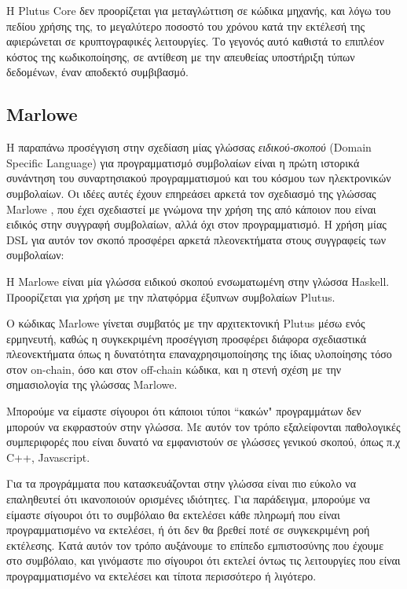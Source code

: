 Η Plutus Core δεν προορίζεται για μεταγλώττιση σε κώδικα μηχανής, και λόγω του πεδίου χρήσης
της, το μεγαλύτερο ποσοστό του χρόνου κατά την εκτέλεσή της αφιερώνεται σε κρυπτογραφικές 
λειτουργίες. Το γεγονός αυτό καθιστά το επιπλέον κόστος της κωδικοποίησης, σε αντίθεση με την
απευθείας υποστήριξη τύπων δεδομένων, έναν αποδεκτό συμβιβασμό.   
                               
                                                                  
                                                                   
                                  
                                   \subsection{Marlowe}    
     
      Η παραπάνω προσέγγιση στην σχεδίαση μίας γλώσσας \emph{ειδικού-σκοπού}  (Domain Specific Language) για προγραμματισμό συμβολαίων είναι η πρώτη ιστορικά
      συνάντηση του συναρτησιακού προγραμματισμού και του κόσμου των ηλεκτρονικών συμβολαίων. 
      Οι ιδέες αυτές έχουν επηρεάσει αρκετά τον σχεδιασμό της γλώσσας Marlowe \cite{marlowe}, που έχει
      σχεδιαστεί με γνώμονα την χρήση της από κάποιον που είναι ειδικός στην συγγραφή συμβολαίων, αλλά
      όχι στον προγραμματισμό. Η χρήση μίας DSL για αυτόν τον σκοπό προσφέρει αρκετά πλεονεκτήματα
      στους συγγραφείς των συμβολαίων:
      
      Η Marlowe είναι μία γλώσσα ειδικού σκοπού ενσωματωμένη στην γλώσσα Haskell. Προορίζεται για χρήση
      με την πλατφόρμα έξυπνων συμβολαίων Plutus.
      
      
      Ο κώδικας Marlowe γίνεται συμβατός με την αρχιτεκτονική Plutus μέσω ενός ερμηνευτή, καθώς η 
      συγκεκριμένη προσέγγιση προσφέρει διάφορα σχεδιαστικά πλεονεκτήματα όπως η δυνατότητα 
      επαναχρησιμοποίησης της ίδιας υλοποίησης τόσο στον on-chain, όσο και στον off-chain κώδικα,
      και η στενή σχέση με την σημασιολογία της γλώσσας Marlowe. 
     

Μπορούμε να είμαστε σίγουροι ότι κάποιοι τύποι ``κακών" προγραμμάτων δεν μπορούν να εκφραστούν
στην γλώσσα. Με αυτόν τον τρόπο εξαλείφονται παθολογικές συμπεριφορές που είναι δυνατό να εμφανιστούν
σε γλώσσες γενικού σκοπού, όπως π.χ C++, Javascript. 

Για τα προγράμματα που κατασκευάζονται στην γλώσσα είναι πιο εύκολο να επαληθευτεί ότι
ικανοποιούν ορισμένες ιδιότητες. Για παράδειγμα, μπορούμε να είμαστε σίγουροι ότι το συμβόλαιο θα
εκτελέσει κάθε πληρωμή που είναι προγραμματισμένο να εκτελέσει, ή ότι δεν θα βρεθεί ποτέ σε 
συγκεκριμένη ροή εκτέλεσης. Κατά αυτόν τον τρόπο αυξάνουμε το επίπεδο εμπιστοσύνης που έχουμε
στο συμβόλαιο, και γινόμαστε πιο σίγουροι ότι εκτελεί όντως τις λειτουργίες που είναι προγραμματισμένο
να εκτελέσει και τίποτα περισσότερο ή λιγότερο.


